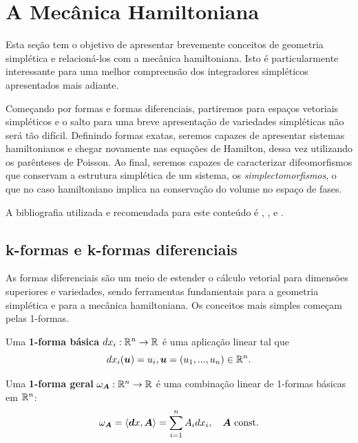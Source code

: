 \section{A Mecânica Hamiltoniana}\label{secao:mecanica_hamiltoniana}

Esta seção tem o objetivo de apresentar brevemente conceitos de geometria simplética e relacioná-los com a mecânica hamiltoniana. Isto é particularmente interessante para uma melhor compreensão dos integradores simpléticos apresentados mais adiante.

Começando por formas e formas diferenciais, partiremos para espaços vetoriais simpléticos e o salto para uma breve apresentação de variedades simpléticas não será tão difícil. Definindo formas exatas, seremos capazes de apresentar sistemas hamiltonianos e chegar novamente nas equações de Hamilton, dessa vez utilizando os parênteses de Poisson. Ao final, seremos capazes de caracterizar difeomorfismos que conservam a estrutura simplética de um sistema, os \textit{simplectomorfismos}, o que no caso hamiltoniano implica na conservação do volume no espaço de fases.

A bibliografia utilizada e recomendada para este conteúdo é \cite{Feng2010}, \cite{Tu2010-sb}, \cite{Arnold2013-bs} e \cite{silva_lectures_2001}.


\subsection{k-formas e k-formas diferenciais}\label{subsecao:k-formas}

As formas diferenciais são um meio de estender o cálculo vetorial para dimensões superiores e variedades, sendo ferramentas fundamentais para a geometria simplética e para a mecânica hamiltoniana. Os conceitos mais simples começam pelas 1-formas.

\begin{definition}[1-formas]
    Uma \textbf{1-forma básica} $dx_i: \mathbb{R}^n \to \mathbb{R}$ é uma aplicação linear tal que
    \begin{equation*}
        dx_i (\bm u) = u_i, \bm u = (u_1, ..., u_n) \in \mathbb{R}^n.
    \end{equation*}

    Uma \textbf{1-forma geral} $\omega_{\bm A}: \mathbb{R}^n \to \mathbb{R}$ é uma combinação linear de 1-formas básicas em $\mathbb{R}^n$:
    \begin{equation*}
        \omega_{\bm A} = \left\langle \bm dx, \bm A \right\rangle = \sum_{i=1}^n A_i dx_i, \quad \bm A \text{ const.}
    \end{equation*}
\end{definition}

